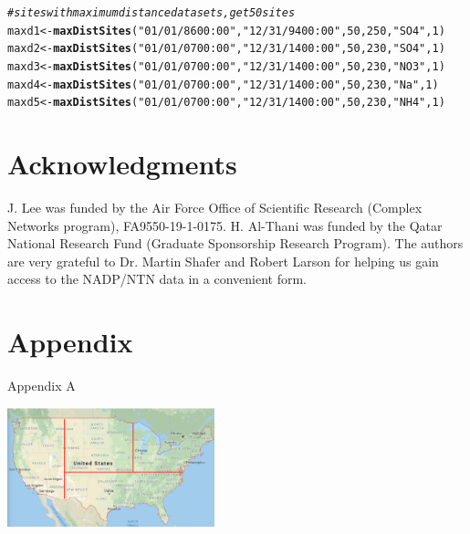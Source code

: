 \documentclass[11pt]{article}\usepackage[]{graphicx}\usepackage[]{color}
\makeatletter
\newcommand{\hlnum}[1]{\textcolor[rgb]{0.686,0.059,0.569}{#1}}%
\newcommand{\hlstr}[1]{\textcolor[rgb]{0.192,0.494,0.8}{#1}}%
\newcommand{\hlcom}[1]{\textcolor[rgb]{0.678,0.584,0.686}{\textit{#1}}}%
\newcommand{\hlstd}[1]{\textcolor[rgb]{0.345,0.345,0.345}{#1}}%
\newcommand{\hlkwb}[1]{\textcolor[rgb]{0.69,0.353,0.396}{#1}}%
\newcommand{\hlkwd}[1]{\textcolor[rgb]{0.737,0.353,0.396}{\textbf{#1}}}%
\newenvironment{kframe}{%
 \def\at@end@of@kframe{}%
 \ifinner\ifhmode%
  \def\at@end@of@kframe{\end{minipage}}%
  \begin{minipage}{\columnwidth}%
 \fi\fi%
 \def\FrameCommand##1{\hskip\@totalleftmargin \hskip-\fboxsep
 \colorbox{shadecolor}{##1}\hskip-\fboxsep
     \hskip-\linewidth \hskip-\@totalleftmargin \hskip\columnwidth}%
 \MakeFramed {\advance\hsize-\width
   \@totalleftmargin\z@ \linewidth\hsize
   \@setminipage}}%
 {\par\unskip\endMakeFramed%
 \at@end@of@kframe}
\newenvironment{knitrout}{}{} %
\makeatother
\begin{document}
\begin{knitrout}
\color{fgcolor}\begin{kframe}
\begin{alltt}
\hlcom{#sites with maximum distance data sets, get 50 sites}
\hlstd{maxd1}  \hlkwb{<-} \hlkwd{maxDistSites}\hlstd{(}\hlstr{"01/01/86 00:00"}\hlstd{,}\hlstr{"12/31/94 00:00"}\hlstd{,}\hlnum{50}\hlstd{,}\hlnum{250}\hlstd{,}\hlstr{"SO4"}\hlstd{,}\hlnum{1}\hlstd{)}
\hlstd{maxd2}  \hlkwb{<-} \hlkwd{maxDistSites}\hlstd{(}\hlstr{"01/01/07 00:00"}\hlstd{,}\hlstr{"12/31/14 00:00"}\hlstd{,}\hlnum{50}\hlstd{,}\hlnum{230}\hlstd{,}\hlstr{"SO4"}\hlstd{,}\hlnum{1}\hlstd{)}
\hlstd{maxd3}  \hlkwb{<-} \hlkwd{maxDistSites}\hlstd{(}\hlstr{"01/01/07 00:00"}\hlstd{,}\hlstr{"12/31/14 00:00"}\hlstd{,}\hlnum{50}\hlstd{,}\hlnum{230}\hlstd{,}\hlstr{"NO3"}\hlstd{,}\hlnum{1}\hlstd{)}
\hlstd{maxd4}  \hlkwb{<-} \hlkwd{maxDistSites}\hlstd{(}\hlstr{"01/01/07 00:00"}\hlstd{,}\hlstr{"12/31/14 00:00"}\hlstd{,}\hlnum{50}\hlstd{,}\hlnum{230}\hlstd{,}\hlstr{"Na"}\hlstd{,}\hlnum{1}\hlstd{)}
\hlstd{maxd5}  \hlkwb{<-} \hlkwd{maxDistSites}\hlstd{(}\hlstr{"01/01/07 00:00"}\hlstd{,}\hlstr{"12/31/14 00:00"}\hlstd{,}\hlnum{50}\hlstd{,}\hlnum{230}\hlstd{,}\hlstr{"NH4"}\hlstd{,}\hlnum{1}\hlstd{)}
\end{alltt}
\end{kframe}
\end{knitrout}

\section*{Acknowledgments} J. Lee was funded by the
Air Force Office of Scientific Research (Complex Networks program), FA9550-19-1-0175.
H. Al-Thani was funded by the Qatar National Research Fund (Graduate Sponsorship Research Program). The authors are very grateful to Dr. Martin Shafer and Robert Larson for helping us gain access to the NADP/NTN data in a convenient form.

\section{Appendix}
Appendix A
\begin{center}
\includegraphics[width = 60mm]{mapDivision}
\end{center}



\end{document}
